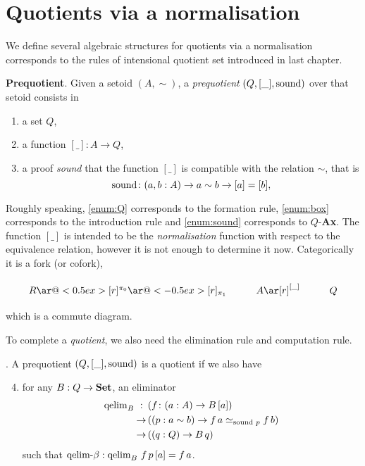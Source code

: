 \section{Quotients via a normalisation}


We define several algebraic structures for quotients via a normalisation corresponds to the rules of intensional quotient set introduced in last chapter.

\begin{definition}
\textbf{Prequotient}.
\noindent
Given a setoid $(A,\sim)$,  a \emph{prequotient} $(Q,[\_],\operatorname{sound})$ over that setoid consists in
\begin{enumerate}
\item \label{enum:Q} a set $Q$,
\item \label{enum:box}a function $[\_]: A \rightarrow Q$,
\item \label{enum:sound} a proof \emph{sound} that the function $[\_]$ is compatible with the relation $\sim$,
that is \[\operatorname{sound}\colon (a,b : A) \rightarrow a\sim b \rightarrow [a] = [b],\]
\end{enumerate}
\end{definition}

Roughly speaking, \ref{enum:Q} corresponds to the formation rule,
\ref{enum:box} corresponds to the introduction
rule and \ref{enum:sound} corresponds to $Q$-\textbf{Ax}. The function $[\_]$ is intended to be the \emph{normalisation}
function with respect to the equivalence relation, however it is not
enough to determine it now. Categorically it is a fork (or cofork),

\[\xymatrix{
R\ar@<0.5ex>[r]^{\pi_0}\ar@<-0.5ex>[r]_{\pi_1}& A\ar[r]^{[\_]}
& Q
}\]

which is a commute diagram.

To complete a \emph{quotient}, we also need the elimination
rule and computation rule.

\begin{definition} 
	.
\noindent
A prequotient $(Q,[\_],\operatorname{sound})$ is a quotient if we also have

\begin{enumerate}
\setcounter{enumi}{3}
\item \label{enum:elim}
for any $B: Q\rightarrow\operatorname{\mathbf{Set}}$, an eliminator
 \begin{align*}
 \operatorname{qelim}_B\,\,:\,\,\,&(f\colon (a:A) \rightarrow B\,[a]) \\
        {\rightarrow}\, &((p:a\sim b) \rightarrow f\,a \simeq_{\operatorname{sound}\,p}f\,b)\\
        {\rightarrow}\, &((q:Q) \rightarrow B\,q)
 \end{align*}
such that $\operatorname{qelim-\beta} : \operatorname{qelim}_B\,f \,p\,[a] = f\,a$.
\end{enumerate}
\end{definition}

